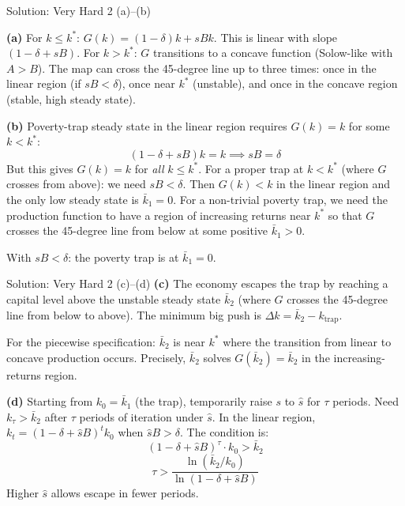 \documentclass[aspectratio=169,10pt]{beamer}
\newcommand{\backbutton}[1]{\hfill\hyperlink{#1}{\beamerbutton{Back}}}
\begin{document}
\begin{frame}{Solution: Very Hard 2 (a)--(b)}
\hypertarget{s-v2}{}

\textbf{(a)} For $k\leq k^*$: $G(k) = (1-\delta)k + sBk$. This is linear with slope $(1-\delta+sB)$. For $k>k^*$: $G$ transitions to a concave function (Solow-like with $A>\!B$). The map can cross the 45-degree line up to three times: once in the linear region (if $sB<\delta$), once near $k^*$ (unstable), and once in the concave region (stable, high steady state).

\medskip
\textbf{(b)} Poverty-trap steady state in the linear region requires $G(k)=k$ for some $k<k^*$:
\[
(1-\delta+sB)k = k \implies sB = \delta
\]
But this gives $G(k)=k$ for \emph{all} $k\leq k^*$. For a proper trap at $k<k^*$ (where $G$ crosses from above): we need $sB<\delta$. Then $G(k)<k$ in the linear region and the only low steady state is $\bar{k}_1=0$. For a non-trivial poverty trap, we need the production function to have a region of increasing returns near $k^*$ so that $G$ crosses the 45-degree line from below at some positive $\bar{k}_1>0$.

With $sB<\delta$: the poverty trap is at $\bar{k}_1=0$.
\end{frame}

\begin{frame}{Solution: Very Hard 2 (c)--(d)}
\textbf{(c)} The economy escapes the trap by reaching a capital level above the unstable steady state $\bar{k}_2$ (where $G$ crosses the 45-degree line from below to above). The minimum big push is $\Delta k = \bar{k}_2 - k_{\text{trap}}$.

For the piecewise specification: $\bar{k}_2$ is near $k^*$ where the transition from linear to concave production occurs. Precisely, $\bar{k}_2$ solves $G(\bar{k}_2)=\bar{k}_2$ in the increasing-returns region.

\medskip
\textbf{(d)} Starting from $k_0 = \bar{k}_1$ (the trap), temporarily raise $s$ to $\hat{s}$ for $\tau$ periods. Need $k_\tau > \bar{k}_2$ after $\tau$ periods of iteration under $\hat{s}$. In the linear region, $k_t = (1-\delta+\hat{s}B)^t k_0$ when $\hat{s}B>\delta$. The condition is:
\[
(1-\delta+\hat{s}B)^\tau \cdot k_0 > \bar{k}_2
\]
\[
\tau > \frac{\ln(\bar{k}_2/k_0)}{\ln(1-\delta+\hat{s}B)}
\]
Higher $\hat{s}$ allows escape in fewer periods.
\backbutton{q-v2}
\end{frame}
\end{document}
